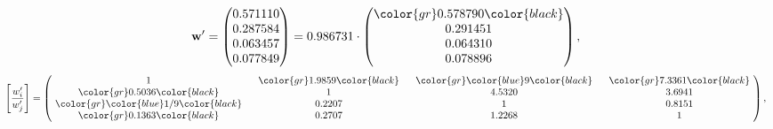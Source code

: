 \begin{example}
\begin{equation*}
\mathbf{w}^{\prime} =
\begin{pmatrix}
0.571110\\
0.287584\\
0.063457\\
0.077849
\end{pmatrix} =
0.986731\cdot
\begin{pmatrix}
\color{gr} 0.578790\color{black} \\
0.291451\\
0.064310\\
0.078896
\end{pmatrix},
\end{equation*}
\begin{equation*}
\left[ \frac{{w}^{\prime}_i}{{w}^{\prime}_j} \right] =
\begin{pmatrix}
$\,\,$ 1 $\,\,$ & $\,\,$\color{gr} 1.9859\color{black} $\,\,$ & $\,\,$\color{gr} \color{blue} 9\color{black} $\,\,$ & $\,\,$\color{gr} 7.3361\color{black} $\,\,$ \\
$\,\,$\color{gr} 0.5036\color{black} $\,\,$ & $\,\,$ 1 $\,\,$ & $\,\,$4.5320$\,\,$ & $\,\,$3.6941  $\,\,$ \\
$\,\,$\color{gr} \color{blue}  1/9\color{black} $\,\,$ & $\,\,$0.2207$\,\,$ & $\,\,$ 1 $\,\,$ & $\,\,$0.8151 $\,\,$ \\
$\,\,$\color{gr} 0.1363\color{black} $\,\,$ & $\,\,$0.2707$\,\,$ & $\,\,$1.2268$\,\,$ & $\,\,$ 1  $\,\,$ \\
\end{pmatrix},
\end{equation*}
\end{example}
\newpage
